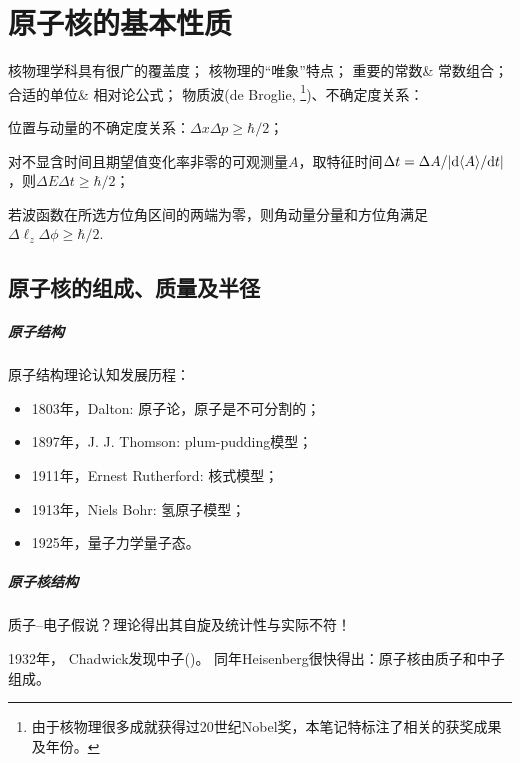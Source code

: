 \chapter{原子核的基本性质}

核物理学科具有很广的覆盖度；
核物理的“唯象”特点；
重要的常数\& 常数组合；
合适的单位\& 相对论公式；
物质波(de Broglie, \footnote{由于核物理很多成就获得过20世纪Nobel奖，本笔记特标注了相关的获奖成果及年份。})、不确定度关系：
\begin{compactenum}
	\item 位置与动量的不确定度关系：$\Delta x\Delta p \geqslant \hbar/2$；
	\item 对不显含时间且期望值变化率非零的可观测量$A$，取特征时间$\Delta t = \Delta A/\lvert\mathop{}\!\mathrm{d}\langle A\rangle/\mathrm{d} t\rvert$，则$\Delta E\Delta t \geqslant \hbar/2$；
	\item 若波函数在所选方位角区间的两端为零，则角动量分量和方位角满足$\Delta \ell_z\Delta\phi \geqslant \hbar/2$.
\end{compactenum}

\section{原子核的组成、质量及半径}

\paragraph{原子结构}

原子结构理论认知发展历程：
\begin{itemize}
	\item 1803年，Dalton: 原子论，原子是不可分割的；
	\item 1897年，J. J. Thomson: plum-pudding模型；
	\item 1911年，Ernest Rutherford: 核式模型；
	\item 1913年，Niels Bohr: 氢原子模型；
	\item 1925年，量子力学量子态。
\end{itemize}

\paragraph{原子核结构}
质子--电子假说？理论得出其自旋及统计性与实际不符！

1932年， Chadwick发现中子()。
同年Heisenberg很快得出：原子核由质子和中子组成。

